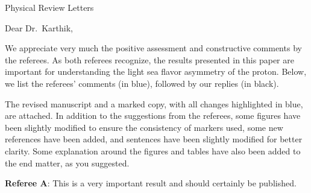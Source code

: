 \documentclass[letterpaper,12pt,oneside,final]{letter}
\date{\today}
\makeatletter
\renewenvironment*{displayquote}
  {\begingroup\color{blue}\csq@getcargs{\csq@bdquote{}{}}}
  {\csq@edquote\endgroup}
\makeatother
\begin{document}
\begin{letter}{Physical Review Letters}
	\opening{Dear Dr.~Karthik,}
	We appreciate very much the positive assessment and constructive comments by the referees.
	As both referees recognize, the results presented in this paper are important for understanding the light sea flavor asymmetry of the proton.
	Below, we list the referees' comments (in blue), followed by our replies (in black).

	The revised manuscript and a marked copy, with all changes highlighted in blue, are attached.
	In addition to the suggestions from the referees, some figures have been slightly modified to ensure the consistency of markers used, some new references have been added,
	and sentences have been slightly modified for better clarity. 
	Some explanation around the figures and tables have also been added to the end matter,
	as you suggested.

	\hrulefill

	\textbf{Referee A}:
	\begin{displayquote}
		This is a very important result and should certainly be published.


\end{displayquote}
\end{letter}
\end{document}
